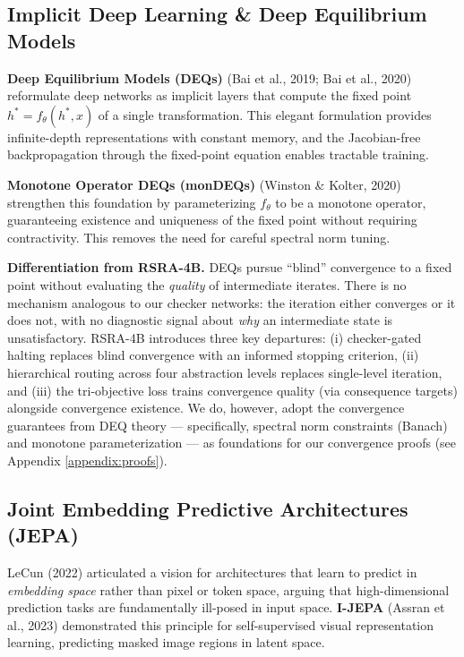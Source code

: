 \documentclass[11pt,a4paper]{article}
\theoremstyle{definition}
\begin{document}
\subsection{Implicit Deep Learning \& Deep Equilibrium Models}

\textbf{Deep Equilibrium Models (DEQs)} (Bai et al., 2019; Bai et al., 2020) reformulate deep networks as implicit layers that compute the fixed point $h^* = f_\theta(h^*, x)$ of a single transformation. This elegant formulation provides infinite-depth representations with constant memory, and the Jacobian-free backpropagation through the fixed-point equation enables tractable training.

\textbf{Monotone Operator DEQs (monDEQs)} (Winston \& Kolter, 2020) strengthen this foundation by parameterizing $f_\theta$ to be a monotone operator, guaranteeing existence and uniqueness of the fixed point without requiring contractivity. This removes the need for careful spectral norm tuning.

\textbf{Differentiation from RSRA-4B.} DEQs pursue ``blind'' convergence to a fixed point without evaluating the \textit{quality} of intermediate iterates. There is no mechanism analogous to our checker networks: the iteration either converges or it does not, with no diagnostic signal about \textit{why} an intermediate state is unsatisfactory. RSRA-4B introduces three key departures: (i) checker-gated halting replaces blind convergence with an informed stopping criterion, (ii) hierarchical routing across four abstraction levels replaces single-level iteration, and (iii) the tri-objective loss trains convergence quality (via consequence targets) alongside convergence existence. We do, however, adopt the convergence guarantees from DEQ theory --- specifically, spectral norm constraints (Banach) and monotone parameterization --- as foundations for our convergence proofs (see Appendix \ref{appendix:proofs}).

\subsection{Joint Embedding Predictive Architectures (JEPA)}

LeCun (2022) articulated a vision for architectures that learn to predict in \textit{embedding space} rather than pixel or token space, arguing that high-dimensional prediction tasks are fundamentally ill-posed in input space. \textbf{I-JEPA} (Assran et al., 2023) demonstrated this principle for self-supervised visual representation learning, predicting masked image regions in latent space.
\end{document}
